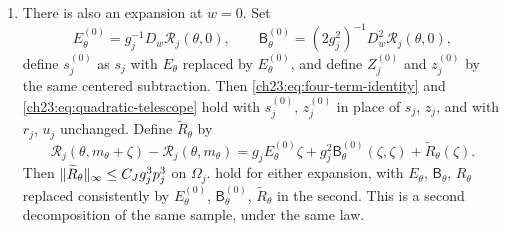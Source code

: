\begin{lemma}
\begin{enumerate}
\begin{equation}
\begin{split}
 u_j=P_\cdot^\delta I_{a_j}U_j^0,
 \end{split}
\end{equation}
with $\theta=\theta_{j-1}$ in $E_\theta$. Then
\begin{equation}\label{ch23:eq:four-term-identity}
 d_j=s_j+z_j+r_j+u_j.
\end{equation}
The terms $s_j$ and $z_j$ have conditional mean zero given $\mathcal F_{j-1}$, while $r_j$ and $u_j$ are $\mathcal F_{j-1}$-measurable; neither of the latter is recentered. With $y_j=\mathcal Q_\delta(x_j,x_j)$, for every $1\le k\le l\le K$,
\begin{equation}\label{ch23:eq:quadratic-telescope}
 y_l-y_{k-1}=\sum_{j=k}^l\bigl\{\mathcal B_\delta(x_{j-1},d_j)+\mathcal Q_\delta(d_j,d_j)\bigr\}.
\end{equation}
Inserting \eqref{ch23:eq:four-term-identity} expresses the right side through the four mixed terms $\mathcal B_\delta(x_{j-1},v)$, $v\in\{s_j,z_j,r_j,u_j\}$, and the sixteen ordered products $\mathcal Q_\delta(v,v')$, $v,v'\in\{s_j,z_j,r_j,u_j\}$; equivalently, through the nine ordered products of $s_j$, $z_j$, and $r_j+u_j$. All these identities are finite and exact, uniformly in $K$, $\mathfrak d_j$, and $\theta_{j-1}$.
\item There is also an expansion at $w=0$. Set
\[
 E_\theta^{(0)}=g_j^{-1}D_w\mathscr R_j(\theta,0),\qquad
 \mathsf B_\theta^{(0)}=(2g_j^2)^{-1}D_w^2\mathscr R_j(\theta,0),
\]
define $s_j^{(0)}$ as $s_j$ with $E_\theta$ replaced by $E_\theta^{(0)}$, and define $Z_j^{(0)}$ and $z_j^{(0)}$ by the same centered subtraction. Then \eqref{ch23:eq:four-term-identity} and \eqref{ch23:eq:quadratic-telescope} hold with $s_j^{(0)}$, $z_j^{(0)}$ in place of $s_j$, $z_j$, and with $r_j$, $u_j$ unchanged. Define $\widetilde R_\theta$ by
\begin{equation}\label{ch23:eq:taylor-at-zero}
 \mathscr R_j(\theta,m_\theta+\zeta)-\mathscr R_j(\theta,m_\theta)
 =g_jE_\theta^{(0)}\zeta+g_j^2\mathsf B_\theta^{(0)}(\zeta,\zeta)+\widetilde R_\theta(\zeta).
\end{equation}
Then $\lVert \widetilde R_\theta\rVert_\infty\le C_Jg_j^3p_j^3$ on $\Omega_j$.  hold for either expansion, with $E_\theta$, $\mathsf B_\theta$, $R_\theta$ replaced consistently by $E_\theta^{(0)}$, $\mathsf B_\theta^{(0)}$, $\widetilde R_\theta$ in the second. This is a second decomposition of the same sample, under the same law.
\end{enumerate}
\end{lemma}


